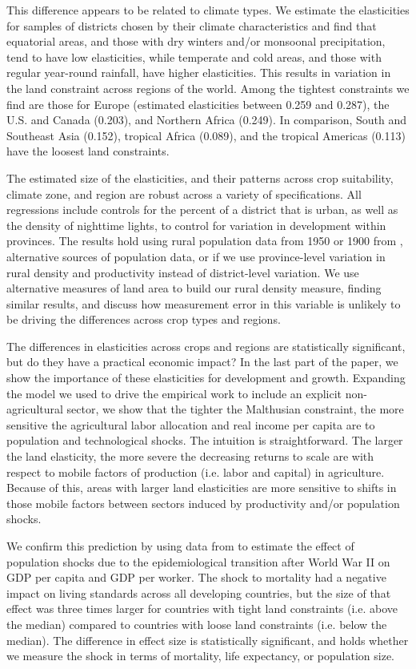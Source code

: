 \documentclass[11pt]{article}
\begin{document}
This difference appears to be related to climate types. We estimate the elasticities for samples of districts chosen by their climate characteristics and find that equatorial areas, and those with dry winters and/or monsoonal precipitation, tend to have low elasticities, while temperate and cold areas, and those with regular year-round rainfall, have higher elasticities. This results in variation in the land constraint across regions of the world. Among the tightest constraints we find are those for Europe (estimated elasticities between 0.259 and 0.287), the U.S. and Canada (0.203), and Northern Africa (0.249). In comparison, South and Southeast Asia (0.152), tropical Africa (0.089), and the tropical Americas (0.113) have the loosest land constraints. 

The estimated size of the elasticities, and their patterns across crop suitability, climate zone, and region are robust across a variety of specifications. All regressions include controls for the percent of a district that is urban, as well as the density of nighttime lights, to control for variation in development within provinces. The results hold using rural population data from 1950 or 1900 from \cite{hyde31}, alternative sources of population data, or if we use province-level variation in rural density and productivity instead of district-level variation. We use alternative measures of land area to build our rural density measure, finding similar results, and discuss how measurement error in this variable is unlikely to be driving the differences across crop types and regions.

The differences in elasticities across crops and regions are statistically significant, but do they have a practical economic impact? In the last part of the paper, we show the importance of these elasticities for development and growth. Expanding the model we used to drive the empirical work to include an explicit non-agricultural sector, we show that the tighter the Malthusian constraint, the more sensitive the agricultural labor allocation and real income per capita are to population and technological shocks. The intuition is straightforward. The larger the land elasticity, the more severe the decreasing returns to scale are with respect to mobile factors of production (i.e. labor and capital) in agriculture. Because of this, areas with larger land elasticities are more sensitive to shifts in those mobile factors between sectors induced by productivity and/or population shocks.

We confirm this prediction by using data from \cite{aj07} to estimate the effect of population shocks due to the epidemiological transition after World War II on GDP per capita and GDP per worker. The shock to mortality had a negative impact on living standards across all developing countries, but the size of that effect was three times larger for countries with tight land constraints (i.e. above the median) compared to countries with loose land constraints (i.e. below the median). The difference in effect size is statistically significant, and holds whether we measure the shock in terms of mortality, life expectancy, or population size. 
\end{document}
